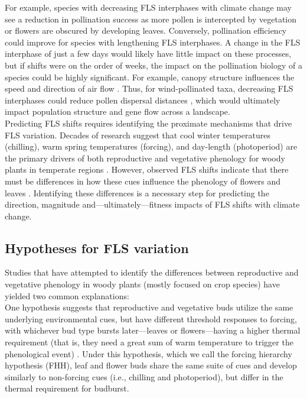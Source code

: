 \documentclass[11pt]{article}\usepackage[]{graphicx}\usepackage[]{color}
\begin{document}
\noindent For example, species with decreasing FLS interphases with climate change may see a reduction in pollination success as more pollen is intercepted by vegetation or flowers are obscured by developing leaves. Conversely, pollination efficiency could improve for species with lengthening FLS interphases. A change in the FLS interphase of just a few days would likely have little impact on these processes, but if shifts were on the order of weeks, the impact on the pollination biology of a species could be highly significant. For example, canopy structure influences the speed and direction of air flow \citep{Niklas1985, Jackson:1999aa}. Thus, for wind-pollinated taxa, decreasing FLS interphases could reduce pollen dispersal distances \citep{Milleron2012}, which would ultimately impact population structure and gene flow across a landscape.\\

\noindent Predicting FLS shifts requires identifying the proximate mechanisms that drive FLS variation. Decades of research suggest that cool winter temperatures (chilling), warm spring temperatures (forcing), and day-length (photoperiod) are the primary drivers of both reproductive and vegetative phenology  for woody plants in temperate regions \citep{Forrest2010,Flynn2018}. However, observed FLS shifts indicate that there must be differences in how these cues influence the phenology of flowers and leaves \citep{Buonaiuto2020}. Identifying these differences is a necessary step for predicting the direction, magnitude and---ultimately---fitness impacts of FLS shifts with climate change.\\ 

\subsection*{Hypotheses for FLS variation}

\noindent Studies that have attempted to identify the differences between reproductive and vegetative phenology in woody plants (mostly focused on crop species) have yielded two common explanations:\\

\noindent One hypothesis suggests that reproductive and vegetative buds utilize the same underlying environmental cues, but have different threshold responses to forcing, with whichever bud type bursts later---leaves or flowers---having a higher thermal requirement (that is, they need a great sum of warm temperature to trigger the phenological event) \citep{Guo2014,COSMULESCU:2020aa,Cosmulescu:2018aa}. Under this hypothesis, which we call the forcing hierarchy hypothesis (FHH), leaf and flower buds share the same suite of cues and develop similarly to non-forcing cues (i.e., chilling and photoperiod), but  differ in the thermal requirement for budburst.\\
\end{document}
